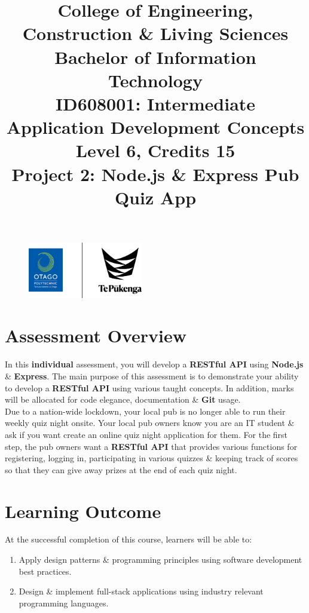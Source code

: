 \documentclass{article}
\author{}
\begin{document}
\begin{figure}
	\centering 
	\includegraphics[width=50mm]{../../resources/img/logo.png}
\end{figure}

\title{College of Engineering, Construction \& Living Sciences\\Bachelor of Information Technology\\ID608001: Intermediate Application Development Concepts\\Level 6, Credits 15\\\textbf{Project 2: Node.js \& Express Pub Quiz App }}
\date{}
\maketitle

\section*{Assessment Overview}
In this \textbf{individual} assessment, you will develop a \textbf{RESTful API} using \textbf{Node.js} \& \textbf{Express}. The main purpose of this assessment is to demonstrate your ability to develop a \textbf{RESTful API} using various taught concepts. In addition, marks will be allocated for code elegance, documentation \& \textbf{Git} usage.\\

Due to a nation-wide lockdown, your local pub is no longer able to run their weekly quiz night onsite. Your local pub owners know you are an IT student \& ask if you want create an online quiz night application for them. For the first step, the pub owners want a \textbf{RESTful API} that provides various functions for registering, logging in, participating in various quizzes \& keeping track of scores so that they can give away prizes at the end of each quiz night.

\section*{Learning Outcome}
At the successful completion of this course, learners will be able to:
\begin{enumerate}
	\item Apply design patterns \& programming principles using software development best practices.
	\item Design \& implement full-stack applications using industry relevant programming languages.
\end{enumerate}
\end{document}

